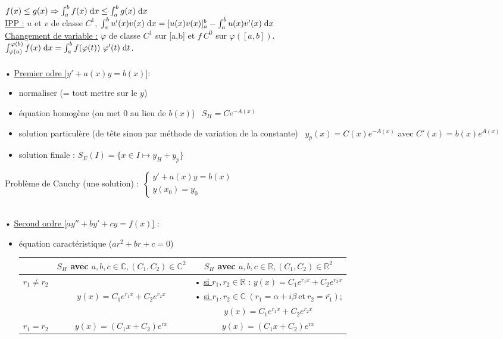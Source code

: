 \documentclass[12 pt]{book}
\begin{document}
\begin{flushleft}
\begin{doublespace}
	\text{ } \\
	$f(x)\leq g(x) \Rightarrow \int_a^b f(x) \; \text{d}x \leq \int_a^b g(x) \; \text{d}x$ \\
	\underline{IPP :} $u$ et $v$ de classe $C^1$, $\int_a^b u'(x)v(x) \; \text{d}x = [u(x)v(x)]_a^b - \int_a^b u(x)v'(x) \; \text{d}x$
	\text{ } \\
	\underline{Changement de variable :} $\varphi$ de classe $C^1$ sur [a,b] et $f \ C^0$ sur $\varphi([a,b])$. \\
	$\int_{\varphi(a)}^{\varphi(b)} f(x) \; \text{d}x = \int_a^b f(\varphi(t)) \ \varphi'(t) \; \text{d}t$.\\
	\text{ } \\
	• \underline{Premier odre [$y'+ a(x)y=b(x)]$}:
	\begin{itemize}
		\item normaliser (= tout mettre sur le $y$)
		\item équation homogène (on met 0 au lieu de $b(x)$) \ $S_H = C e^{-A(x)}$
		\item solution particulère (de tête sinon par méthode de variation de la constante) \ $y_p (x) = C(x) e^{-A(x)}$ avec $C'(x)=b(x) e^{A(x)}$
		\item solution finale : $S_E (I) = \{ x\in I \mapsto y_H+y_p\}$
	\end{itemize}
	Problème de Cauchy (une solution) :  $ \left\{\begin{array}{ll} y' + a(x)y = b(x) \\  y(x_0) = y_0 \end{array} \right.$
	
	\text{ } \\
	• \underline{Second ordre [$ay'' + by' + cy = f(x)$]} :
	\begin{itemize}
		\item équation caractéristique ($ a r^2 + b r + c = 0$)
		\begin{tabular}{|c|c|c|}
		\hline
		 & $S_H$ avec $a,b,c \in \mathbb{C}, (C_1,C_2)\in \mathbb{C}^2$ & $S_H$ avec $a,b,c \in \mathbb{R}, (C_1,C_2)\in \mathbb{R}^2$  \\
		\hline
		$r_1 \ne r_2$ &  & • \underline{si $r_1,r_2 \in \mathbb{R}$} : $y(x) = C_1 e^{r_1 x} + C_2 e^{r_2 x}$ \\ 
		& $y(x)=C_1 e^{r_1 x} + C_2 e^{r_2 x}$ & • \underline{si $r_1,r_2 \in \mathbb{C}\ (r_1=\alpha + i \beta \  \text{et} \  r_2 = \bar{r_1} )$:} \\
		& & $y(x) = C_1 e^{r_1 x} + C_2 e^{r_2 x}$  \\
		\hline
		$r_1 = r_2$ & $y(x) = (C_1 x + C_2) e^{r x}$ & $y(x) = (C_1 x + C_2) e^{r x}$ \\
		\hline
		\end{tabular}
		

\end{itemize}
\end{doublespace}
\end{flushleft}
\end{document}
